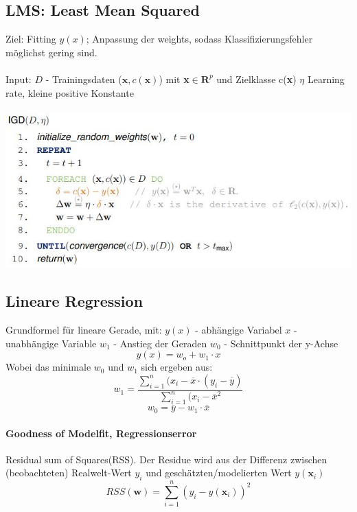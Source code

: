 \documentclass[11pt,a4paper]{article}
\begin{document}
\begin{flushleft}
    \subsection{LMS: Least Mean Squared}
    Ziel: Fitting $y(x)$; Anpassung der weights, sodass Klassifizierungsfehler möglichst gering sind. \\~\\
    Input: $D$ - Trainingsdaten ($\mathbf{x},c(\mathbf{x})$) mit \textbf{x}$\in \textbf{R}^p$ und Zielklasse c(\textbf{x}) 
    $\eta$ Learning rate, kleine positive Konstante
    \\~\\
\includegraphics[width=\textwidth]{IGD}

\subsection{Lineare Regression}

Grundformel für lineare Gerade, mit: \newline
$y(x)$ - abhängige Variabel
$x$ - unabhängige Variable
$w_1$ - Anstieg der Geraden
$w_0$ - Schnittpunkt der y-Achse
\begin{equation}
    y(x)=w_o+w_1\cdot x
\end{equation}
Wobei das minimale $w_0$ und $w_1$ sich ergeben aus:
\begin{equation}
    w_1=\frac{\sum\limits^{n}_{i=1}(x_i-\overline{x}\cdot(y_i-\overline{y})}{\sum\limits_{i=1}^{n}(x_i-\overline{x}^2}
\end{equation}
\begin{equation}
    w_0=\overline{y}-w_1\cdot\overline{x}
\end{equation}

\paragraph{Goodness of Modelfit, Regressionserror}
Residual sum of Squares(RSS). \newline
Der Residue wird aus der Differenz zwischen (beobachteten) Realwelt-Wert $y_i$ und geschätzten/modelierten Wert $y(\mathbf{x}_i)$
\begin{equation}
    RSS(\mathbf{w}) = \sum^{n}_{i=1}(y_i-y(\mathbf{x}_i))^2
\end{equation}


\end{flushleft}
\end{document}
